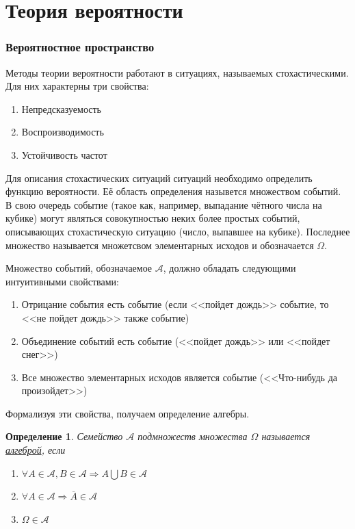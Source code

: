 \documentclass[12pt]{article}
\newtheorem{Def}{Определение}
\numberwithin{Th}{section}
\numberwithin{Def}{section}
\numberwithin{Lem}{section}
\numberwithin{St}{section}
\numberwithin{equation}{section}
\newcommand\Ev{\mathscr{A}}
\begin{document}
\tableofcontents
\newpage

\part{Теория вероятности}
\newpage

\section{Вероятностное пространство}
\qquad Методы теории вероятности работают в ситуациях, называемых стохастическими. Для них характерны три свойства:
\begin{enumerate}
	\item Непредсказуемость 
	\item Воспроизводимость 
	\item Устойчивость частот
\end{enumerate}

Для описания стохастических ситуаций ситуаций необходимо определить функцию вероятности. Её область определения назывется множеством событий.
В свою очередь событие (такое как, например, выпадание чётного числа на кубике) могут являться совокупностью неких более простых событий, описывающих стохастическую ситуацию (число, выпавшее на кубике). Последнее множество называется множетсвом элементарных исходов и обозначается $\Omega$.  

Множество событий, обозначаемое $\Ev$, должно обладать следующими интуитивными свойствами:
\begin{enumerate}
	\item Отрицание события есть событие (если <<пойдет дождь>> событие, то <<не пойдет дождь>> также событие)
	\item Объединение событий есть событие (<<пойдет дождь>> или <<пойдет снег>>)
	\item Все множество элементарных исходов является событие (<<Что-нибудь да произойдет>>)
\end{enumerate}

Формализуя эти свойства, получаем определение алгебры.
\begin{Def}
Семейство $\Ev$ подмножеств множества $\Omega$  называется \\ \underline{алгеброй}, если 
\begin{enumerate}
	\item $\forall A \in \Ev, B\in \Ev \Rightarrow A \bigcup B \in \Ev$
	\item $\forall A \in \Ev \Rightarrow \overline{A} \in \Ev$
	\item $\Omega \in \Ev$
\end{enumerate}
\end{Def}
\end{document}
